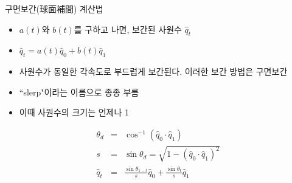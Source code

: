 \begin{frame}[fragile]{구면보간(球面補間) 계산법}

\begin{itemize}
\item $a(t)$와 $b(t)$를 구하고 나면, 보간된 사원수 $\hat q_t$
\item $\hat q_t = a(t) \hat q_0 + b(t) \hat q_1$
\end{itemize}

\begin{itemize}
\item 사원수가 동일한 각속도로 부드럽게 보간된다. 이러한 보간 방법은 구면보간
\item ``slerp"이라는 이름으로 종종 부름
\item 이때 사원수의 크기는 언제나 1
\end{itemize}

\begin{eqnarray} \nonumber
\theta_d & = & \cos^{-1} (\hat q_0 \cdot \hat q_1) \\ \nonumber
s & = & \sin \theta_d = \sqrt{1 - (\hat q_0 \cdot \hat q_1)^2} \\ \nonumber
\hat q_t & = & \frac{\sin \theta_{1-t}}{s} \hat q_0+ \frac{\sin \theta_t}{s} \hat q_1 \nonumber
\end{eqnarray}


\end{frame}













